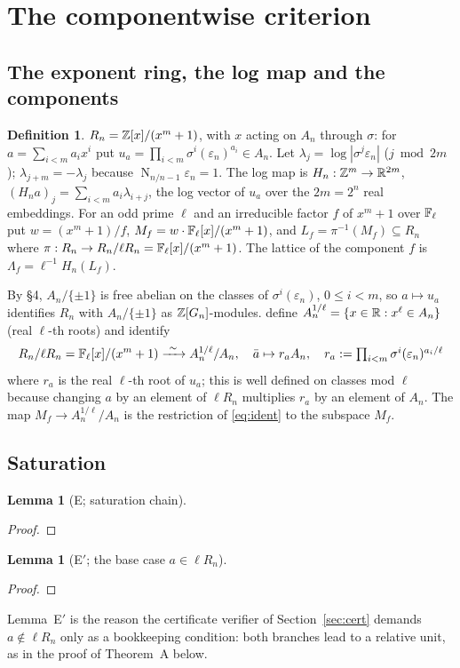 \documentclass[11pt]{amsart}
\newtheorem{lemma}[theorem]{Lemma}
\theoremstyle{remark}\newtheorem{remark}[theorem]{Remark}
\theoremstyle{definition}\newtheorem{definition}[theorem]{Definition}
\newcommand{\Nr}{\operatorname{N}_{n/n-1}}\newcommand{\covol}{\operatorname{covol}}
\providecommand{\proofsdir}{../../proofs} %
\begin{document}
\section{The componentwise criterion}\label{sec:crit}
\subsection{The exponent ring, the log map and the components}
\begin{definition}\label{def:H}
$R_n=\mathbb{Z}[x]/(x^m+1)$, with $x$ acting on $A_n$ through $\sigma$: for $a=\sum_{i<m}a_ix^i$ put $u_a=\prod_{i<m}\sigma^i(\varepsilon_n)^{a_i}\in A_n$. Let $\lambda_j=\log|\sigma^j\varepsilon_n|$ ($j\bmod 2m$); $\lambda_{j+m}=-\lambda_j$ because $\Nr\varepsilon_n=1$. The log map is $H_n:\mathbb{Z}^m\to\mathbb{R}^{2m}$, $(H_na)_j=\sum_{i<m}a_i\lambda_{i+j}$, the log vector of $u_a$ over the $2m=2^n$ real embeddings. For an odd prime $\ell$ and an irreducible factor $f$ of $x^m+1$ over $\mathbb{F}_\ell$ put $w=(x^m+1)/f$, $M_f=w\cdot\mathbb{F}_\ell[x]/(x^m+1)$, and $L_f=\pi^{-1}(M_f)\subseteq R_n$ where $\pi:R_n\to R_n/\ell R_n=\mathbb{F}_\ell[x]/(x^m+1)$. The lattice of the component $f$ is $\Lambda_f=\ell^{-1}H_n(L_f)$.
\end{definition}
By \cite{KY} \S4, $A_n/\{\pm1\}$ is free abelian on the classes of $\sigma^i(\varepsilon_n)$, $0\le i<m$, so $a\mapsto u_a$ identifies $R_n$ with $A_n/\{\pm1\}$ as $\mathbb{Z}[G_n]$-modules. \cite{KY} define $A_n^{1/\ell}=\{x\in\mathbb{R}: x^\ell\in A_n\}$ (real $\ell$-th roots) and identify
\begin{equation}\label{eq:ident}
R_n/\ell R_n=\F_\ell[x]/(x^m+1)\xrightarrow{\ \sim\ }A_n^{1/\ell}/A_n,\quad \bar a\mapsto r_a A_n,\quad r_a:=\textstyle\prod_{i<m}\sigma^i(\varepsilon_n)^{a_i/\ell}
\end{equation}
where $r_a$ is the real $\ell$-th root of $u_a$; this is well defined on classes mod $\ell$ because changing $a$ by an element of $\ell R_n$ multiplies $r_a$ by an element of $A_n$. The map $M_f\to A_n^{1/\ell}/A_n$ is the restriction of \eqref{eq:ident} to the subspace $M_f$.

\subsection{Saturation}\label{sec:sat}
\begin{lemma}[E; saturation chain]\label{lem:E}

\end{lemma}
\begin{proof}

\end{proof}
\begin{lemma}[E$'$; the base case $a\in\ell R_n$]\label{lem:Eprime}

\end{lemma}
\begin{proof}

\end{proof}
Lemma~E$'$ is the reason the certificate verifier of Section~\ref{sec:cert} demands $a\notin\ell R_n$ only as a bookkeeping condition: both branches lead to a relative unit, as in the proof of Theorem~A below.
\end{document}
